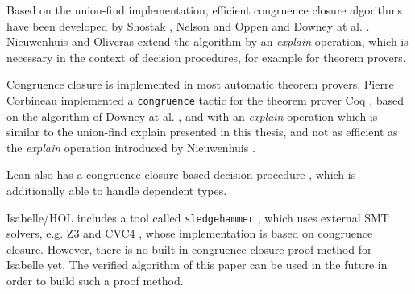 Based on the union-find implementation, efficient congruence closure algorithms have been developed by Shostak \cite{congruenceclosure-og2}, Nelson and Oppen \cite{congruenceclosure-og} and Downey at al. \cite{congruenceclosure-og3}.
Nieuwenhuis and Oliveras \cite{Nieuwenhuis} extend the algorithm by an \emph{explain} operation, which is necessary in the context of decision procedures, for example for theorem provers.

Congruence closure is implemented in most automatic theorem provers. Pierre Corbineau implemented a \lstinline|congruence| tactic for the theorem prover Coq \cite{congruenceclosure-coq, congruence-coq}, based on the algorithm of Downey at al. \cite{congruenceclosure-og3}, and with an \emph{explain} operation which is similar to the union-find explain presented in this thesis, and not as efficient as the \emph{explain} operation introduced by Nieuwenhuis \cite{Nieuwenhuis}.

Lean also has a congruence-closure based decision procedure \cite{congruenceclosure-lean}, which is additionally able to handle dependent types.

Isabelle/HOL includes a tool called \lstinline|sledgehammer| \cite{sledgehammer}, which uses external SMT solvers, e.g. Z3 \cite{z3} and CVC4 \cite{cvc4}, whose implementation is based on congruence closure. However, there is no built-in congruence closure proof method for Isabelle yet. The verified algorithm of this paper can be used in the future in order to build such a proof method.
